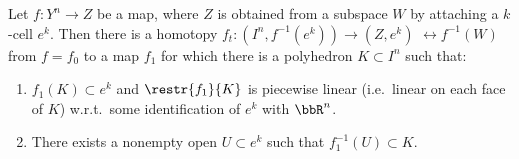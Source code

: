\begin{lem}\label{lem 4.10 hatcher}
    Let $f:Y^n\to Z$ be a map, where $Z$ is obtained from a subspace $W$ by attaching a $k$-cell $e^k$. Then there is a homotopy $f_t:(I^n,f^{-1}(e^k))\to (Z,e^k)$ $\rel f^{-1}(W)$ from $f=f_0$ to a map $f_1$ for which there is a polyhedron $K\subset I^n$ such that:
    \begin{enumerate}[label=(\alph*)]
        \item $f_1(K)\subset e^k$ and $\restr{f_1}{K}$ is piecewise linear (i.e.~linear on each face of $K$) w.r.t.\ some identification of $e^k$ with $\bbR^n$.
        \item There exists a nonempty open $U\subset e^k$ such that $f_1^{-1}(U)\subset K$.
    \end{enumerate}
\end{lem}
